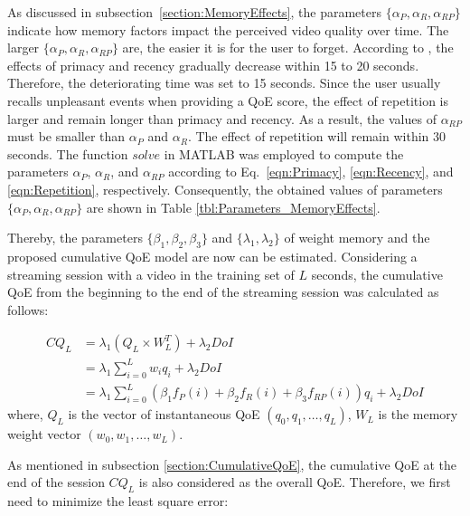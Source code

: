 As discussed in subsection~\ref{section:MemoryEffects}, the parameters $\{ \alpha_{P}, \alpha_{R}, \alpha_{RP} \}$ indicate how memory factors impact the perceived video quality over time. The larger $\{\alpha_{P}, \alpha_{R}, \alpha_{RP} \}$ are, the easier it is for the user to forget. According to \cite{PrimacyVsRecency, NetflixQoE}, the effects of primacy and recency gradually decrease within 15 to 20 seconds. Therefore, the deteriorating time was set to 15 seconds. Since the user usually recalls unpleasant events when providing a QoE score, the effect of repetition is larger and remain longer than primacy and recency. As a result, the values of $\alpha_{RP}$ must be smaller than $\alpha_{P}$ and $\alpha_{R}$. The effect of repetition will remain within 30 seconds. The function $solve$ in MATLAB \cite{MATLAB} was employed to compute the parameters $\alpha_{P}$, $\alpha_{R}$, and $\alpha_{RP}$ according to Eq.~\ref{eqn:Primacy}, \ref{eqn:Recency}, and \ref{eqn:Repetition}, respectively. Consequently, the obtained values of parameters $\{ \alpha_{P},\alpha_{R}, \alpha_{RP} \}$ are shown in Table \ref{tbl:Parameters_MemoryEffects}.
  




Thereby, the parameters $\{\beta_{1}, \beta_{2}, \beta_{3}\}$ and $\{ \lambda_{1}, \lambda_{2} \}$ of weight memory and the proposed cumulative QoE model are now can be estimated. Considering a streaming session with a video in the training set of $L$ seconds, the cumulative QoE from the beginning to the end of the streaming session was calculated as follows:
  
\begin{equation}
\begin{split}
  CQ_{L} &= \lambda_{1} \left ( {Q}_{L}\times{W}^{T}_{L} \right ) + \lambda_{2}DoI \\
         &= \lambda_{1} \sum_{i=0}^{L}{w_{i}q_{i}} + \lambda_{2}DoI \\
         &= \lambda_{1} \sum_{i=0}^{L}{\left ( \beta_{1}f_{P}(i) + \beta_{2}f_{R}(i) + \beta_{3}f_{RP}(i) \right ) q_{i}} + \lambda_{2}DoI
\end{split}
\end{equation}
where, ${Q}_{L}$ is the vector of instantaneous QoE $(q_{0},  q_{1}, \dots, q_{L})$,  ${W}_{L}$ is the memory weight vector $(w_{0},  w_{1}, \dots, w_{L})$.


As mentioned in subsection \ref{section:CumulativeQoE}, the cumulative QoE at the end of the session $CQ_{L}$ is also considered as the overall QoE. Therefore, we first need to minimize the least square error:

